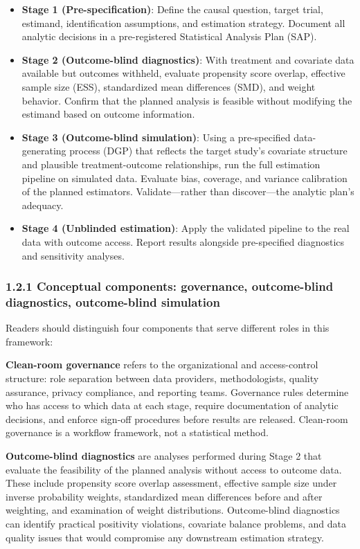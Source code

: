 \documentclass[
  letterpaper,
  DIV=11,
  numbers=noendperiod]{scrartcl}
\providecommand{\tightlist}{%
  \setlength{\itemsep}{0pt}\setlength{\parskip}{0pt}}\usepackage{longtable,booktabs,array}
\begin{document}
\begin{itemize}
\tightlist
\item
  \textbf{Stage 1 (Pre-specification)}: Define the causal question,
  target trial, estimand, identification assumptions, and estimation
  strategy. Document all analytic decisions in a pre-registered
  Statistical Analysis Plan (SAP).
\item
  \textbf{Stage 2 (Outcome-blind diagnostics)}: With treatment and
  covariate data available but outcomes withheld, evaluate propensity
  score overlap, effective sample size (ESS), standardized mean
  differences (SMD), and weight behavior. Confirm that the planned
  analysis is feasible without modifying the estimand based on outcome
  information.
\item
  \textbf{Stage 3 (Outcome-blind simulation)}: Using a pre-specified
  data-generating process (DGP) that reflects the target study's
  covariate structure and plausible treatment-outcome relationships, run
  the full estimation pipeline on simulated data. Evaluate bias,
  coverage, and variance calibration of the planned estimators.
  Validate---rather than discover---the analytic plan's adequacy.
\item
  \textbf{Stage 4 (Unblinded estimation)}: Apply the validated pipeline
  to the real data with outcome access. Report results alongside
  pre-specified diagnostics and sensitivity analyses.
\end{itemize}

\subsubsection{1.2.1 Conceptual components: governance, outcome-blind
diagnostics, outcome-blind
simulation}\label{conceptual-components-governance-outcome-blind-diagnostics-outcome-blind-simulation}

Readers should distinguish four components that serve different roles in
this framework:

\textbf{Clean-room governance} refers to the organizational and
access-control structure: role separation between data providers,
methodologists, quality assurance, privacy compliance, and reporting
teams. Governance rules determine who has access to which data at each
stage, require documentation of analytic decisions, and enforce sign-off
procedures before results are released. Clean-room governance is a
workflow framework, not a statistical method.

\textbf{Outcome-blind diagnostics} are analyses performed during Stage 2
that evaluate the feasibility of the planned analysis without access to
outcome data. These include propensity score overlap assessment,
effective sample size under inverse probability weights, standardized
mean differences before and after weighting, and examination of weight
distributions. Outcome-blind diagnostics can identify practical
positivity violations, covariate balance problems, and data quality
issues that would compromise any downstream estimation strategy.
\end{document}

